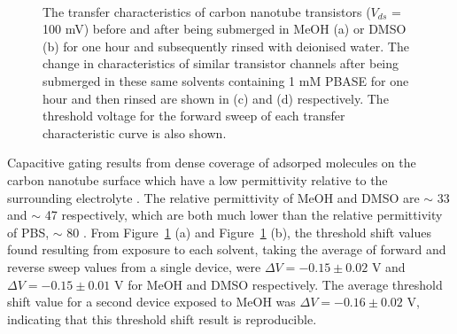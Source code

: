 \documentclass[
  a4paper,
]{scrbook}
\begin{document}
\begin{figure}
\begin{minipage}[t]{0.45\linewidth}
{{}

}

\end{minipage}%
%
\begin{minipage}[t]{0.01\linewidth}

{\centering 

~

}

\end{minipage}%

\caption[The transfer characteristics of carbon nanotube transistors
before and after being submerged in MeOH or DMSO for one hour, either
with or without 1 mM PBASE
present.]{\label{fig-PBASE-vs-solvent-only}The transfer characteristics
of carbon nanotube transistors (\(V_{ds}\) = 100 mV) before and after
being submerged in MeOH (a) or DMSO (b) for one hour and subsequently
rinsed with deionised water. The change in characteristics of similar
transistor channels after being submerged in these same solvents
containing 1 mM PBASE for one hour and then rinsed are shown in (c) and
(d) respectively. The threshold voltage for the forward sweep of each
transfer characteristic curve is also shown.}

\end{figure}

Capacitive gating results from dense coverage of adsorped molecules on
the carbon nanotube surface which have a low permittivity relative to
the surrounding electrolyte \autocite{Heller2008}. The relative
permittivity of MeOH and DMSO are \(\sim\) 33 \autocite{Mohsen-Nia2010}
and \(\sim\) 47 \autocite{Hunger2010} respectively, which are both much
lower than the relative permittivity of PBS, \(\sim\) 80
\autocite{Shkodra2021}. From Figure~\ref{fig-PBASE-vs-solvent-only} (a)
and Figure~\ref{fig-PBASE-vs-solvent-only} (b), the threshold shift
values found resulting from exposure to each solvent, taking the average
of forward and reverse sweep values from a single device, were
\(\Delta V = -0.15 \pm 0.02\) V and \(\Delta V = -0.15 \pm 0.01\) V for
MeOH and DMSO respectively. The average threshold shift value for a
second device exposed to MeOH was \(\Delta V = -0.16 \pm 0.02\) V,
indicating that this threshold shift result is reproducible.
\end{document}
